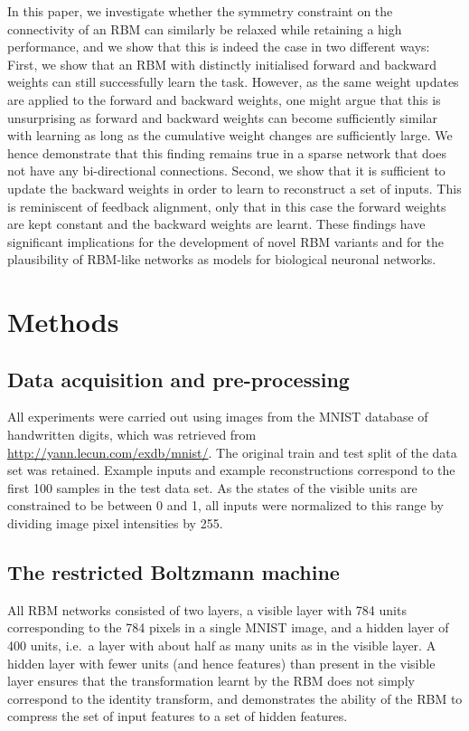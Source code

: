 \documentclass[11pt]{article}
\begin{document}
In this paper, we investigate whether the symmetry constraint on the
connectivity of an RBM can similarly be relaxed while retaining a high
performance, and we show that this is indeed the case in two different
ways: %
First, we show that an RBM with distinctly initialised forward and
backward weights can still successfully learn the task. However, as
the same weight updates are applied to the forward and backward
weights, one might argue that this is unsurprising as forward and
backward weights can become sufficiently similar with learning as long
as the cumulative weight changes are sufficiently large. We hence
demonstrate that this finding remains true in a sparse network that
does not have any bi-directional connections. %
Second, we show that it is sufficient to update the backward weights
in order to learn to reconstruct a set of inputs. This is reminiscent
of feedback alignment, only that in this case the forward weights are
kept constant and the backward weights are learnt. %
These findings have significant implications for the development of
novel RBM variants and for the plausibility of RBM-like networks as
models for biological neuronal networks.

\section{Methods}

\subsection{Data acquisition and pre-processing}

All experiments were carried out using images from the MNIST database
of handwritten digits, which was retrieved from
\url{http://yann.lecun.com/exdb/mnist/}. The original train and test
split of the data set was retained. Example inputs and example
reconstructions correspond to the first 100 samples in the test data
set. As the states of the visible units are constrained to be between
0 and 1, all inputs were normalized to this range by dividing image
pixel intensities by 255.

\subsection{The restricted Boltzmann machine}

All RBM networks consisted of two layers, a visible layer with 784
units corresponding to the 784 pixels in a single MNIST image, and a
hidden layer of 400 units, i.e.\ a layer with about half as many units
as in the visible layer. A hidden layer with fewer units (and hence
features) than present in the visible layer ensures that the
transformation learnt by the RBM does not simply correspond to the
identity transform, and demonstrates the ability of the RBM to
compress the set of input features to a set of hidden features.
\end{document}
